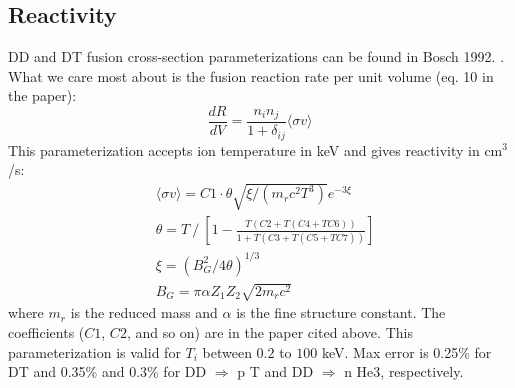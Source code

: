 \subsection{Reactivity}
DD and DT fusion cross-section parameterizations can be found in Bosch 1992. \cite{Bosch_1992}. What we care most about is the fusion reaction rate per unit volume (eq. 10 in the paper):
\begin{equation}
    \frac{dR}{dV} = \frac{n_i n_j}{1+\delta_{ij}} \langle \sigma v \rangle
\end{equation}
This parameterization accepts ion temperature in keV and gives reactivity in cm$^3$/s:
\begin{align}
    & \langle \sigma v \rangle = C1 \cdot \theta \sqrt{\xi / (m_r c^2 T^3)} e^{-3 \xi} \\
    & \theta = T \mathbin{/} \left[ 1 - \frac{T(C2 + T(C4 + TC6))}{1 + T(C3 + T(C5 + TC7))} \right] \\
    & \xi = \left( B_G^2 / 4\theta \right)^{1/3} \\
    & B_G = \pi \alpha Z_1 Z_2 \sqrt{2 m_r c^2}
\end{align}
where $m_r$ is the reduced mass and $\alpha$ is the fine structure constant. The coefficients ($C1$, $C2$, and so on) are in the paper cited above. This parameterization is valid for $T_i$ between $0.2$ to $100$ keV. 
Max error is 0.25\% for DT and 0.35\% and 0.3\% for DD $\Rightarrow$ p T and DD $\Rightarrow$ n He3, respectively. 

